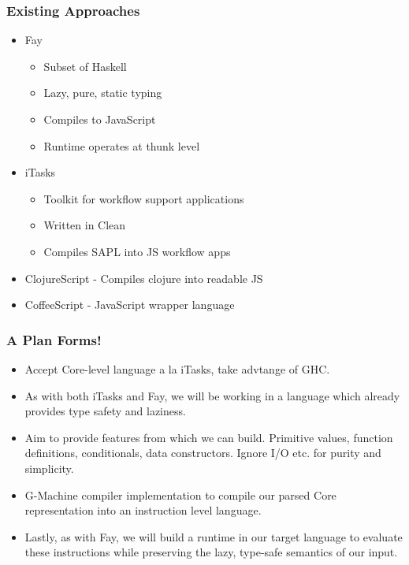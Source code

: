 \documentclass{beamer}
\begin{document}
\begin{frame}
	\frametitle{Existing Approaches}
	\begin{itemize}
		\item Fay
		\begin{itemize}
			\item Subset of Haskell
			\item Lazy, pure, static typing
			\item Compiles to JavaScript
			\item Runtime operates at thunk level
		\end{itemize}
		\item iTasks
		\begin{itemize}
			\item Toolkit for workflow support applications
			\item Written in Clean
			\item Compiles SAPL into JS workflow apps
			
		\end{itemize}
		\item ClojureScript - Compiles clojure into readable JS
		\item CoffeeScript - JavaScript wrapper language
	\end{itemize}
\end{frame}

\begin{frame}
	\frametitle{A Plan Forms!}
	\begin{itemize}
		\item Accept Core-level language a la iTasks, take advtange of GHC.
		\item As with both iTasks and Fay, we will be working in a language
			  which already provides type safety and laziness.
		\item Aim to provide features from which we can build. Primitive
			  values, function definitions, conditionals, data constructors.
			  Ignore I/O etc. for purity and simplicity.
		\item G-Machine compiler implementation
			  to compile our parsed Core representation into an instruction
			  level language.
		\item Lastly, as with Fay, we will build a runtime in our target
			  language to evaluate these instructions while preserving the
			  lazy, type-safe semantics of our input.
	\end{itemize}
\end{frame}
\end{document}
